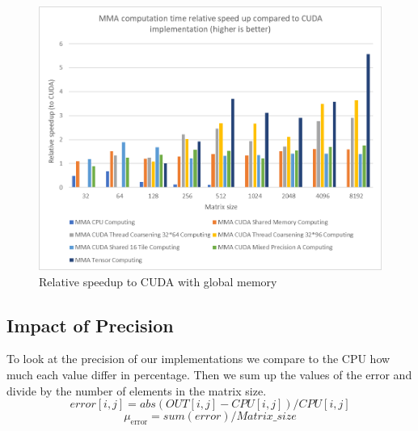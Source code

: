 \documentclass[conference]{IEEEtran}
\begin{document}
  \begin{figure}[h]
    \centering
    \includegraphics[scale=0.53]{figures/relative_speedup_2.png}
    \caption{Relative speedup to CUDA with global memory}
    \label{fig:performance-comparison}
  \end{figure}
  
  
  
  \subsection{Impact of Precision}\label{sec:impact-precision}
  
  To look at the precision of our implementations we compare to the CPU how much each value differ in percentage.
  Then we sum up the values of the error and divide by the number of elements in the matrix size.
  \[error[i,j] = abs(OUT[i,j] - CPU[i,j]) / CPU[i,j] \]
  \[\mu_{\mathrm{error}} = sum(error)/Matrix\_size\]
\end{document}
